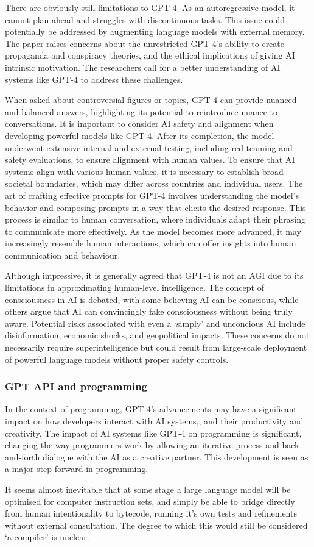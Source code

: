 There are obviously still limitations to GPT-4. As an autoregressive model, it cannot plan ahead and struggles with discontinuous tasks. This issue could potentially be addressed by augmenting language models with external memory. The paper raises concerns about the unrestricted GPT-4's ability to create propaganda and conspiracy theories, and the ethical implications of giving AI intrinsic motivation. The researchers call for a better understanding of AI systems like GPT-4 to address these challenges.\par
When asked about controversial figures or topics, GPT-4 can provide nuanced and balanced answers, highlighting its potential to reintroduce nuance to conversations. It is important to consider AI safety and alignment when developing powerful models like GPT-4. After its completion, the model underwent extensive internal and external testing, including red teaming and safety evaluations, to ensure alignment with human values. To ensure that AI systems align with various human values, it is necessary to establish broad societal boundaries, which may differ across countries and individual users. The art of crafting effective prompts for GPT-4 involves understanding the model's behavior and composing prompts in a way that elicits the desired response. This process is similar to human conversation, where individuals adapt their phrasing to communicate more effectively. As the model becomes more advanced, it may increasingly resemble human interactions, which can offer insights into human communication and behaviour. \par 
Although impressive, it is generally agreed that GPT-4 is not an AGI due to its limitations in approximating human-level intelligence. The concept of consciousness in AI is debated, with some believing AI can be conscious, while others argue that AI can convincingly fake consciousness without being truly aware. Potential risks associated with even a `simply' and unconcious AI include disinformation, economic shocks, and geopolitical impacts. These concerns do not necessarily require superintelligence but could result from large-scale deployment of powerful language models without proper safety controls.
\subsubsection{GPT API and programming}
In the context of programming, GPT-4's advancements may have a significant impact on how developers interact with AI systems,, and their productivity and creativity. The impact of AI systems like GPT-4 on programming is significant, changing the way programmers work by allowing an iterative process and back-and-forth dialogue with the AI as a creative partner. This development is seen as a major step forward in programming.\par 
It seems almost inevitable that at some stage a large language model will be optimised for computer instruction sets,   and simply be able to bridge directly from human intentionality to bytecode, running it's own tests and refinements without external consultation. The degree to which this would still be considered `a compiler' is unclear.
